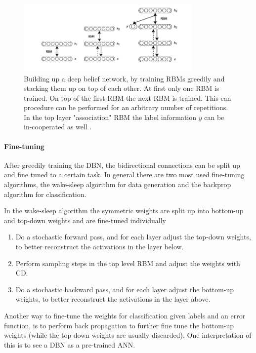 \begin{figure}
	\centering
    	\includegraphics[width=0.8\textwidth]{imgs/dbn_stacking.png} 
    \caption{Building up a deep belief network, by training RBMs greedily and stacking them up on top of each other. At first only one RBM is trained. On top of the first RBM the next RBM is trained. This can procedure can be performed for an arbitrary number of repetitions. In the top layer "association" RBM the label information $y$ can be in-cooperated as well \cite{cdImg}.}
	\label{fig:dbn}
\end{figure}

\paragraph{Fine-tuning}

After greedily training the DBN, the bidirectional connections can be split up and fine tuned to a certain task.
In general there are two most used fine-tuning algorithms, the wake-sleep algorithm for data generation and the backprop algorithm for classification. 

In the wake-sleep algorithm the symmetric weights are split up into bottom-up and top-down weights and are fine-tuned individually \cite{hinton1995wake}
\begin{enumerate}
\item Do a stochastic forward pass, and for each layer adjust the top-down weights, to better reconstruct the activations in the layer below.
\item Perform sampling steps in the top level RBM and adjust the weights with CD.
\item Do a stochastic backward pass, and for each layer adjust the bottom-up weights, to better reconstruct the activations in the layer above.
\end{enumerate}

Another way to fine-tune the weights for classification given labels and an error function, is to perform back propagation to further fine tune the bottom-up weights (while the top-down weights are usually discarded). 
One interpretation of this is to see a DBN as a pre-trained ANN.

